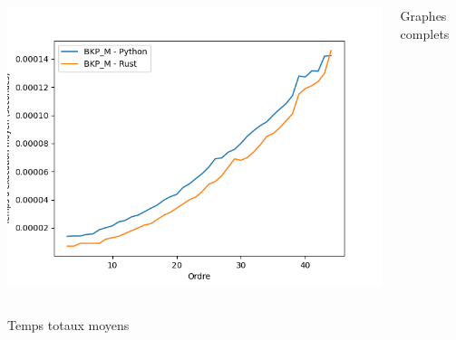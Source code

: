 \documentclass{beamer}
\begin{document}
\begin{frame}
\begin{columns}
    \includegraphics[width=\textwidth]{images/total_BKP_M_new_pyrust_pivot_complete_plot.png}
    \caption{Graphes complets}
  \end{columns}
  \begin{center}
    Temps totaux moyens
  \end{center}
\end{frame}
\end{document}
